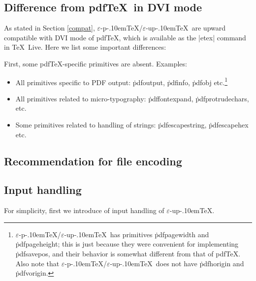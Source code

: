 \documentclass[a4paper,11pt,dvipdfmx]{article}
\let\emph=\origemph
\def\eTeXpre{$\varepsilon$-}
\def\epTeX{\leavevmode\hbox{\eTeXpre\pTeX}}
\def\eupTeX{\leavevmode\hbox{\eTeXpre\upTeX}}
\def\pTeX{p\kern-.10em\TeX}\def\upTeX{u\pTeX}
\def\pdfTeX{pdf\TeX}
\def\TL{\TeX\ Live\xspace}
\begin{document}
\subsection{Difference from \pdfTeX\ in DVI mode}\label{dvi-pdftex}

As stated in Section \ref{compat}, \epTeX/\eupTeX\ are
\emph{not} upward compatible with DVI mode of \pdfTeX,
which is available as the |etex| command in \TL.
Here we list some important differences:

First, some \pdfTeX-specific primitives are absent. Examples:
\begin{itemize}
 \item All primitives specific to PDF output:
   \.{pdfoutput}, \.{pdfinfo}, \.{pdfobj} etc.\footnote{%
    \epTeX/\eupTeX\ has primitives \.{pdfpagewidth} and \.{pdfpageheight};
    this is just because they were convenient for implementing \.{pdfsavepos},
    and their behavior is somewhat different from that of \pdfTeX.
    Also note that \epTeX/\eupTeX\ does not have \.{pdfhorigin}
    and \.{pdfvorigin}.}
 \item All primitives related to micro-typography:
   \.{pdffontexpand}, \.{pdfprotrudechars}, etc.
 \item Some primitives related to handling of strings:
   \.{pdfescapestring}, \.{pdfescapehex} etc.
\end{itemize}



\subsection{Recommendation for file encoding}


\subsection{Input handling}

For simplicity, first we introduce of input handling of \eupTeX.

\end{document}
